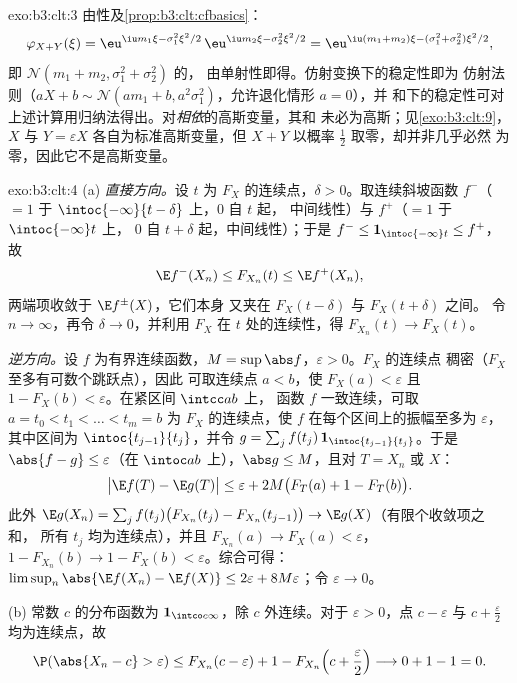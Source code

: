 \begin{solution}{exo:b3:clt:3}
由性及\cref{prop:b3:clt:cfbasics}：
\[
\varphi_{X+Y}(\xi) = \eu^{\iu m_1\xi - \sigma_1^2\xi^2/2}\,
\eu^{\iu m_2\xi - \sigma_2^2\xi^2/2}
= \eu^{\iu(m_1+m_2)\xi - (\sigma_1^2+\sigma_2^2)\xi^2/2},
\]
即 $\mathcal N(m_1 + m_2, \sigma_1^2 + \sigma_2^2)$ 的，
由单射性即得。仿射变换下的稳定性即为
仿射法则（$aX + b \sim \mathcal N(am_1 + b,
a^2\sigma_1^2)$，允许退化情形 $a = 0$），并
和下的稳定性可对
上述计算用归纳法得出。对\emph{相依}的高斯变量，其和
未必为高斯；见\cref{exo:b3:clt:9}，$X$ 与 $Y =
\varepsilon X$ 各自为标准高斯变量，但 $X + Y$
以概率 $\frac12$ 取零，却并非几乎必然
为零，因此它不是高斯变量。
\end{solution}

\begin{solution}{exo:b3:clt:4}
(a) \emph{直接方向。}设 $t$ 为
$F_X$ 的连续点，$\delta > 0$。取连续斜坡函数
$f^-$（$= 1$ 于 $\intoc{-\infty}{t-\delta}$ 上，$0$ 自 $t$ 起，
中间线性）与 $f^+$（$= 1$ 于 $\intoc{-\infty}t$ 上，
$0$ 自 $t + \delta$ 起，中间线性）；于是 $f^- \leq
\mathbf 1_{\intoc{-\infty}t} \leq f^+$，故
\[
\E f^-(X_n) \leq F_{X_n}(t) \leq \E f^+(X_n),
\]
两端项收敛于 $\E f^\pm(X)$，它们本身
又夹在 $F_X(t - \delta)$ 与 $F_X(t + \delta)$ 之间。
令 $n \to \infty$，再令 $\delta \to 0$，并利用
$F_X$ 在 $t$ 处的连续性，得 $F_{X_n}(t) \to F_X(t)$。

\emph{逆方向。}设 $f$ 为有界连续函数，$M =
\sup\abs f$，$\varepsilon > 0$。$F_X$ 的连续点
稠密（$F_X$ 至多有可数个跳跃点），因此
可取连续点 $a < b$，使 $F_X(a) < \varepsilon$
且 $1 - F_X(b) < \varepsilon$。在紧区间 $\intcc ab$ 上，
函数 $f$ 一致连续，可取
$a = t_0 < t_1 < \dots < t_m = b$ 为 $F_X$ 的连续点，使
$f$ 在每个区间上的振幅至多为 $\varepsilon$，
其中区间为 $\intoc{t_{j-1}}{t_j}$，并令 $g = \sum_j
f(t_j)\,\mathbf 1_{\intoc{t_{j-1}}{t_j}}$。于是 $\abs{f - g}
\leq \varepsilon$（在 $\intoc ab$ 上），$\abs g \leq M$，且对
$T = X_n$ 或 $X$：
\[
\bigl|\E f(T) - \E g(T)\bigr| \leq \varepsilon +
2M\bigl(F_T(a) + 1 - F_T(b)\bigr).
\]
此外 $\E g(X_n) = \sum_j f(t_j)\bigl(F_{X_n}(t_j) -
F_{X_n}(t_{j-1})\bigr) \to \E g(X)$（有限个收敛项之和，
所有 $t_j$ 均为连续点），并且
$F_{X_n}(a) \to F_X(a) < \varepsilon$，$1 - F_{X_n}(b) \to 1
- F_X(b) < \varepsilon$。综合可得：
$\limsup_n\abs{\E f(X_n) - \E f(X)} \leq 2\varepsilon +
8M\varepsilon$；令 $\varepsilon \to 0$。

(b) 常数 $c$ 的分布函数为
$\mathbf 1_{\intco c\infty}$，除 $c$ 外连续。对于
$\varepsilon > 0$，点 $c - \varepsilon$ 与 $c +
\frac\varepsilon2$ 均为连续点，故
\[
\P(\abs{X_n - c} > \varepsilon) \leq F_{X_n}(c -
\varepsilon) + 1 - F_{X_n}\Bigl(c + \frac\varepsilon2\Bigr)
\longrightarrow 0 + 1 - 1 = 0 .
\]
\end{solution}

